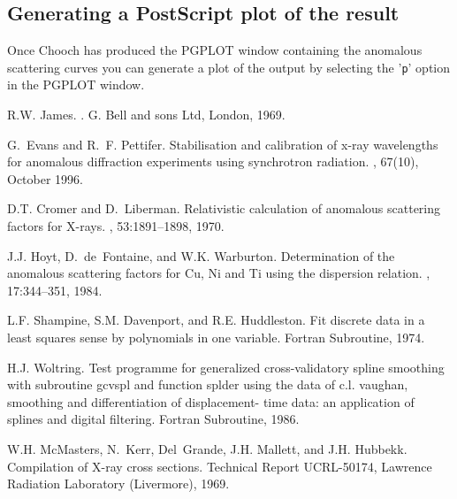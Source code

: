 \documentclass[a4]{article}
\begin{document}
\subsection{Generating a {\sc PostScript} plot of the result}

Once {\sc Chooch} has produced the PGPLOT window containing the
anomalous scattering curves you can generate a plot of the output by selecting
the '{\tt p}' option in the PGPLOT window.


\begin{thebibliography}{1}

 R.W. James.  .  \newblock G. Bell and sons Ltd,
London, 1969.

G.~Evans and R.~F. Pettifer.
\newblock Stabilisation and calibration of x-ray wavelengths for anomalous
  diffraction experiments using synchrotron radiation.
, 67(10), October 1996.

D.T. Cromer and D.~Liberman.
\newblock Relativistic calculation of anomalous scattering factors for
  {X}-rays.
, 53:1891--1898, 1970.

J.J. Hoyt, D.~de~Fontaine, and W.K. Warburton.
\newblock Determination of the anomalous scattering factors for {C}u, {N}i and
  {T}i using the dispersion relation.
, 17:344--351, 1984.

L.F. Shampine, S.M. Davenport, and R.E. Huddleston.
\newblock Fit discrete data in a least squares sense by polynomials in one
  variable.
\newblock Fortran Subroutine, 1974.

H.J. Woltring.
\newblock Test programme for generalized cross-validatory spline smoothing with
  subroutine gcvspl and function splder using the data of c.l. vaughan,
  smoothing and differentiation of displacement- time data: an application of
  splines and digital filtering.
\newblock Fortran Subroutine, 1986.

W.H. McMasters, N.~Kerr, Del~Grande, J.H. Mallett, and J.H. Hubbekk.
\newblock Compilation of {X}-ray cross sections.
\newblock Technical Report UCRL-50174, Lawrence Radiation Laboratory
  (Livermore), 1969.

\end{thebibliography}
\end{document}
